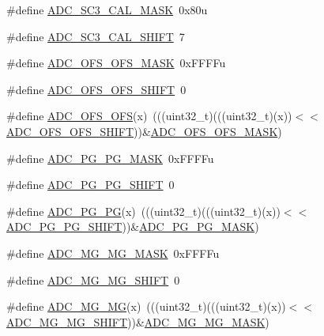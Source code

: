 \begin{DoxyCompactItemize}
\item 
\#define \hyperlink{group___a_d_c___register___masks_ga0ec589c9101684eeac4af85452ed3673}{A\+D\+C\+\_\+\+S\+C3\+\_\+\+C\+A\+L\+\_\+\+M\+A\+SK}~0x80u
\item 
\#define \hyperlink{group___a_d_c___register___masks_ga808101f85e6ceff194c212faacf4bd9d}{A\+D\+C\+\_\+\+S\+C3\+\_\+\+C\+A\+L\+\_\+\+S\+H\+I\+FT}~7
\item 
\#define \hyperlink{group___a_d_c___register___masks_ga1532ae43eb63d6c071f531cca89fdb68}{A\+D\+C\+\_\+\+O\+F\+S\+\_\+\+O\+F\+S\+\_\+\+M\+A\+SK}~0x\+F\+F\+F\+Fu
\item 
\#define \hyperlink{group___a_d_c___register___masks_ga86de5d25a5433db6e96700e2d000ad07}{A\+D\+C\+\_\+\+O\+F\+S\+\_\+\+O\+F\+S\+\_\+\+S\+H\+I\+FT}~0
\item 
\#define \hyperlink{group___a_d_c___register___masks_gad48888faa6b880f4011253b53413f37b}{A\+D\+C\+\_\+\+O\+F\+S\+\_\+\+O\+FS}(x)~(((uint32\+\_\+t)(((uint32\+\_\+t)(x))$<$$<$\hyperlink{group___a_d_c___register___masks_ga86de5d25a5433db6e96700e2d000ad07}{A\+D\+C\+\_\+\+O\+F\+S\+\_\+\+O\+F\+S\+\_\+\+S\+H\+I\+FT}))\&\hyperlink{group___a_d_c___register___masks_ga1532ae43eb63d6c071f531cca89fdb68}{A\+D\+C\+\_\+\+O\+F\+S\+\_\+\+O\+F\+S\+\_\+\+M\+A\+SK})
\item 
\#define \hyperlink{group___a_d_c___register___masks_ga0619279d8dcf43af1fda9f27090ae51b}{A\+D\+C\+\_\+\+P\+G\+\_\+\+P\+G\+\_\+\+M\+A\+SK}~0x\+F\+F\+F\+Fu
\item 
\#define \hyperlink{group___a_d_c___register___masks_ga014623fb35c473d12ff7fc64c3e8cfe3}{A\+D\+C\+\_\+\+P\+G\+\_\+\+P\+G\+\_\+\+S\+H\+I\+FT}~0
\item 
\#define \hyperlink{group___a_d_c___register___masks_ga4b6bf1c895aa431e08bed733de13e71e}{A\+D\+C\+\_\+\+P\+G\+\_\+\+PG}(x)~(((uint32\+\_\+t)(((uint32\+\_\+t)(x))$<$$<$\hyperlink{group___a_d_c___register___masks_ga014623fb35c473d12ff7fc64c3e8cfe3}{A\+D\+C\+\_\+\+P\+G\+\_\+\+P\+G\+\_\+\+S\+H\+I\+FT}))\&\hyperlink{group___a_d_c___register___masks_ga0619279d8dcf43af1fda9f27090ae51b}{A\+D\+C\+\_\+\+P\+G\+\_\+\+P\+G\+\_\+\+M\+A\+SK})
\item 
\#define \hyperlink{group___a_d_c___register___masks_ga9f415258af1bad0159dd605efccd043b}{A\+D\+C\+\_\+\+M\+G\+\_\+\+M\+G\+\_\+\+M\+A\+SK}~0x\+F\+F\+F\+Fu
\item 
\#define \hyperlink{group___a_d_c___register___masks_ga4b2717da089f0de5bd41ef91001b7cfe}{A\+D\+C\+\_\+\+M\+G\+\_\+\+M\+G\+\_\+\+S\+H\+I\+FT}~0
\item 
\#define \hyperlink{group___a_d_c___register___masks_gaca09277ff124324eca091b84eb116176}{A\+D\+C\+\_\+\+M\+G\+\_\+\+MG}(x)~(((uint32\+\_\+t)(((uint32\+\_\+t)(x))$<$$<$\hyperlink{group___a_d_c___register___masks_ga4b2717da089f0de5bd41ef91001b7cfe}{A\+D\+C\+\_\+\+M\+G\+\_\+\+M\+G\+\_\+\+S\+H\+I\+FT}))\&\hyperlink{group___a_d_c___register___masks_ga9f415258af1bad0159dd605efccd043b}{A\+D\+C\+\_\+\+M\+G\+\_\+\+M\+G\+\_\+\+M\+A\+SK})
$$
\end{DoxyCompactItemize}
